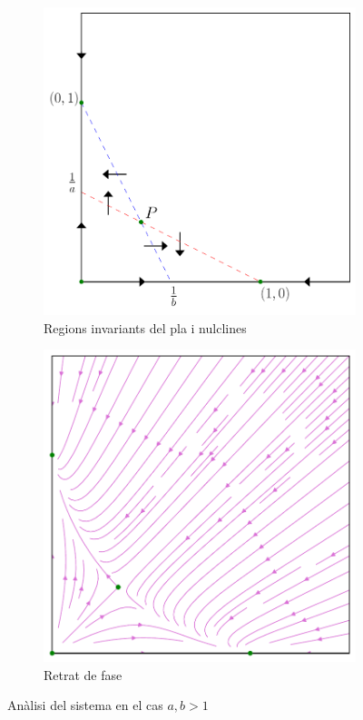 \documentclass[12pt]{article}
\numberwithin{table}{section}
\numberwithin{equation}{section}
\numberwithin{figure}{section}
\begin{document}
\begin{figure}
	\centering
	\begin{subfigure}[htb]{0.48\textwidth}
		\centering
		\includegraphics[width=\textwidth]{retrat-2a.pdf}
		\caption{Regions invariants del pla i nulclines}
		\label{fig:retrat 2a}
	\end{subfigure}
	\begin{subfigure}[htb]{0.48\textwidth}
		\centering
		\includegraphics[width=\textwidth]{retrat-2b.pdf}
		\caption{Retrat de fase}
		\label{fig:retrat 2b}
	\end{subfigure}
	\caption{Anàlisi del sistema en el cas \( a,b > 1 \)}
	\label{fig:retrat 2}
\end{figure}
\end{document}
